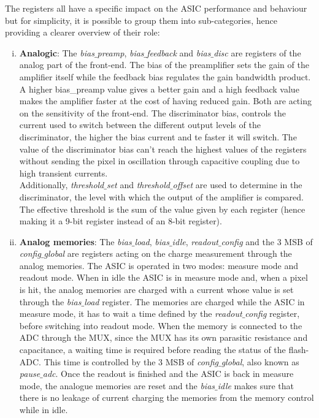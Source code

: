 		The registers all have a specific impact on the ASIC performance and behaviour but for simplicity, it is possible to group them into sub-categories, hence providing a clearer overview of their role:  
		\begin{enumerate}[i)]
			\item \textbf{Analogic}: The \textit{bias$\_$preamp}, \textit{bias$\_$feedback} and \textit{bias$\_$disc} are registers of the analog part of the front-end. The bias of the preamplifier sets the gain of the amplifier itself while the feedback bias regulates the gain bandwidth product. A higher bias\_preamp value gives a better gain and a high feedback value makes the amplifier faster at the cost of having reduced gain. Both are acting on the sensitivity of the front-end. The discriminator bias, controls the current used to switch between the different output levels of the discriminator, the higher the bias current and te faster it will switch. The value of the discriminator bias can't reach the highest values of the registers without sending the pixel in oscillation through capacitive coupling due to high transient currents. \\ Additionally, \textit{threshold$\_$set} and \textit{threshold$\_$offset} are used to determine in the discriminator, the level with which the output of the amplifier is compared. The effective threshold is the sum of the value given by each register (hence making it a 9-bit register instead of an 8-bit register). 
			\item \textbf{Analog memories}: The \textit{bias$\_$load}, \textit{bias$\_$idle}, \textit{readout$\_$config} and the 3 MSB of \textit{config$\_$global} are registers acting on the charge measurement through the analog memories. The ASIC is operated in two modes: measure mode and readout mode. When in idle the ASIC is in measure mode and, when a pixel is hit, the analog memories are charged with a current whose value is set through the \textit{bias$\_$load} register. The memories are charged while the ASIC in measure mode, it has to wait a time defined by the \textit{readout$\_$config} register, before switching into readout mode. When the memory is connected to the ADC through the MUX, since the MUX has its own parasitic resistance and capacitance, a waiting time is required before reading the status of the flash-ADC. This time is controlled by the 3 MSB of \textit{config$\_$global}, also known as \textit{pause$\_$adc}. Once the readout is finished and the ASIC is back in measure mode, the analogue memories are reset and the \textit{bias$\_$idle} makes sure that there is no leakage of current charging the memories from the memory control while in idle. 

\end{enumerate}
